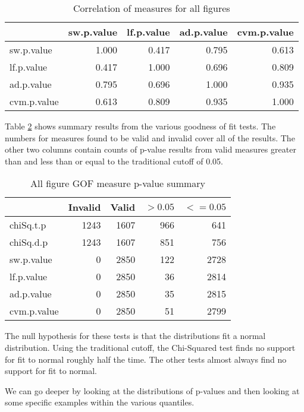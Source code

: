 \begin{table}[h!]
\centering
\begin{tabular}{l | r r r r}
& sw.p.value & lf.p.value & ad.p.value & cvm.p.value \\
 \hline
sw.p.value   & 1.000  & 0.417  & 0.795   & 0.613 \\
lf.p.value   & 0.417  & 1.000  & 0.696   & 0.809 \\
ad.p.value   & 0.795  & 0.696  & 1.000   & 0.935 \\
cvm.p.value  & 0.613  & 0.809  & 0.935   & 1.000 \\
\end{tabular}
\caption{Correlation of measures for all figures}
\label{table:allcorr}
\end{table}

Table \ref{table:allsumm} shows summary results from the various goodness
of fit tests.
The numbers for measures found to be valid and invalid cover all of the
results.
The other two columns contain counts of p-value results from valid measures
greater than and less than or equal to the traditional cutoff of 0.05.

\begin{table}[h!]
\centering
\begin{tabular}{l | r r r r}
& Invalid & Valid & $> 0.05$ & $<= 0.05$ \\
 \hline
chiSq.t.p   & 1243 & 1607 &  966 &  641 \\
chiSq.d.p   & 1243 & 1607 &  851 &  756 \\
sw.p.value  &    0 & 2850 &  122 & 2728 \\
lf.p.value  &    0 & 2850 &   36 & 2814 \\
ad.p.value  &    0 & 2850 &   35 & 2815 \\
cvm.p.value &    0 & 2850 &   51 & 2799 \\
\end{tabular}
\caption{All figure GOF measure p-value summary}
\label{table:allsumm}
\end{table}

The null hypothesis for these tests is that the distributions fit a normal
distribution. Using the traditional cutoff,
the Chi-Squared test finds no support for fit to normal roughly half the time.
The other tests almost always find no support for fit to normal.

We can go deeper by looking at the distributions of p-values and then
looking at some specific examples within the various quantiles.

